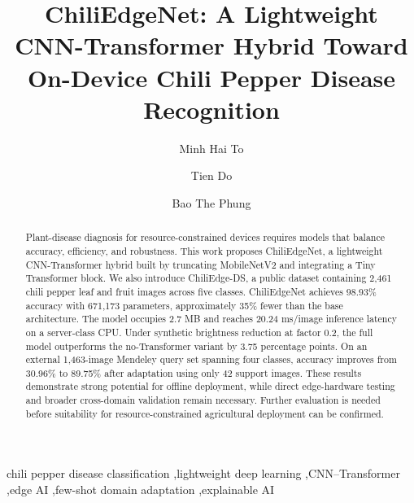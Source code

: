 \documentclass[times,review,10pt]{elsarticle}
\renewcommand{\_}{\textunderscore\allowbreak}
\begin{document}
\begin{frontmatter}

\title{ChiliEdgeNet: A Lightweight CNN-Transformer Hybrid Toward On-Device Chili Pepper Disease Recognition}

\author[a,b]{Minh Hai To}
\author[a,b,c]{Tien Do}
\author[c]{Bao The Phung}


\begin{abstract}
Plant-disease diagnosis for resource-constrained devices requires models that balance accuracy, efficiency, and robustness. This work proposes ChiliEdgeNet, a lightweight CNN-Transformer hybrid built by truncating MobileNetV2 and integrating a Tiny Transformer block. We also introduce ChiliEdge-DS, a public dataset containing 2,461 chili pepper leaf and fruit images across five classes. ChiliEdgeNet achieves 98.93\% accuracy with 671,173 parameters, approximately 35\% fewer than the base architecture. The model occupies 2.7 MB and reaches 20.24 ms/image inference latency on a server-class CPU. Under synthetic brightness reduction at factor 0.2, the full model outperforms the no-Transformer variant by 3.75 percentage points. On an external 1,463-image Mendeley query set spanning four classes, accuracy improves from 30.96\% to 89.75\% after adaptation using only 42 support images. These results demonstrate strong potential for offline deployment, while direct edge-hardware testing and broader cross-domain validation remain necessary. Further evaluation is needed before suitability for resource-constrained agricultural deployment can be confirmed.
\end{abstract}

\begin{keyword}
chili pepper disease classification \sep lightweight deep learning \sep CNN--Transformer \sep edge AI \sep few-shot domain adaptation \sep explainable AI
\end{keyword}

\end{frontmatter}
\end{document}
